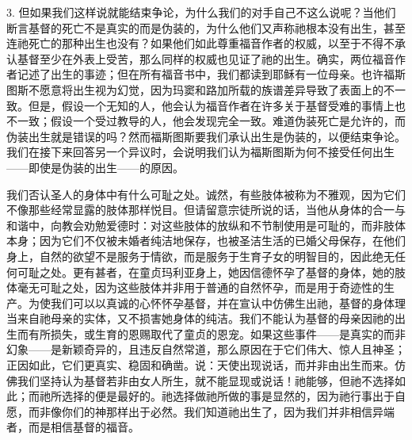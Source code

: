 3. 但如果我们这样说就能结束争论，为什么我们的对手自己不这么说呢？当他们断言基督的死亡不是真实的而是伪装的，为什么他们又声称祂根本没有出生，甚至连祂死亡的那种出生也没有？如果他们如此尊重福音作者的权威，以至于不得不承认基督至少在外表上受苦，那么同样的权威也见证了祂的出生。确实，两位福音作者记述了出生的事迹；但在所有福音书中，我们都读到耶稣有一位母亲。也许福斯图斯不愿意将出生视为幻觉，因为玛窦和路加所载的族谱差异导致了表面上的不一致。但是，假设一个无知的人，他会认为福音作者在许多关于基督受难的事情上也不一致；假设一个受过教导的人，他会发现完全一致。难道伪装死亡是允许的，而伪装出生就是错误的吗？然而福斯图斯要我们承认出生是伪装的，以便结束争论。我们在接下来回答另一个异议时，会说明我们认为福斯图斯为何不接受任何出生——即使是伪装的出生——的原因。\par

我们否认圣人的身体中有什么可耻之处。诚然，有些肢体被称为不雅观，因为它们不像那些经常显露的肢体那样悦目。但请留意宗徒所说的话，当他从身体的合一与和谐中，向教会劝勉爱德时：对这些肢体的放纵和不节制使用是可耻的，而非肢体本身；因为它们不仅被未婚者纯洁地保存，也被圣洁生活的已婚父母保存，在他们身上，自然的欲望不是服务于情欲，而是服务于生育子女的明智目的，因此绝无任何可耻之处。更有甚者，在童贞玛利亚身上，她因信德怀孕了基督的身体，她的肢体毫无可耻之处，因为这些肢体并非用于普通的自然怀孕，而是用于奇迹性的生产。为使我们可以以真诚的心怀怀孕基督，并在宣认中仿佛生出祂，基督的身体理当来自祂母亲的实体，又不损害她身体的纯洁。我们不能认为基督的母亲因祂的出生而有所损失，或生育的恩赐取代了童贞的恩宠。如果这些事件——是真实的而非幻象——是新颖奇异的，且违反自然常道，那么原因在于它们伟大、惊人且神圣；正因如此，它们更真实、稳固和确凿。说：天使出现说话，而并非由出生而来。仿佛我们坚持认为基督若非由女人所生，就不能显现或说话！祂能够，但祂不选择如此；而祂所选择的便是最好的。祂选择做祂所做的事是显然的，因为祂行事出于自愿，而非像你们的神那样出于必然。我们知道祂出生了，因为我们并非相信异端者，而是相信基督的福音。\par




